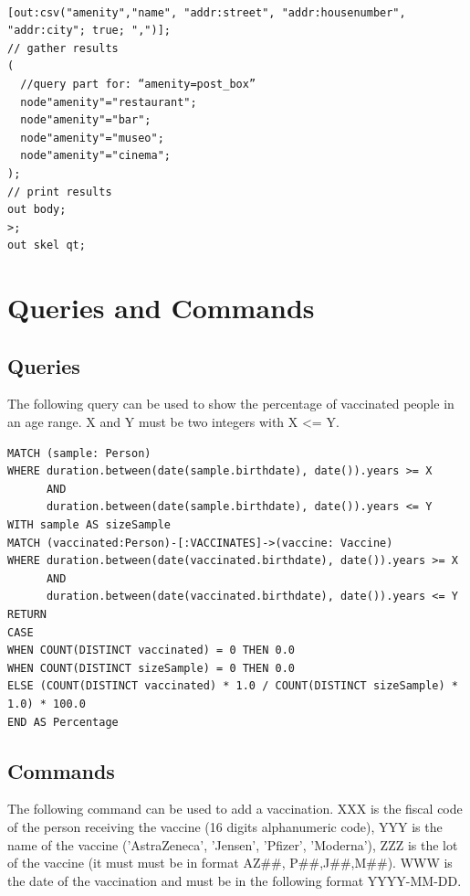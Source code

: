 \documentclass{article}
\begin{document}
\begin{lstlisting}[language=cypher, label=lst:cypher-example]

[out:csv("amenity","name", "addr:street", "addr:housenumber", "addr:city"; true; ",")]; 
// gather results 
( 
  //query part for: “amenity=post_box” 
  node"amenity"="restaurant"; 
  node"amenity"="bar"; 
  node"amenity"="museo"; 
  node"amenity"="cinema"; 
); 
// print results 
out body; 
>; 
out skel qt;
\end{lstlisting}

\section{Queries and Commands}
\subsection{Queries}
The following query can be used to show the percentage of vaccinated people in an age range.
X and Y must be two integers with X <= Y.\\

\begin{lstlisting}[language=cypher, label=lst:cypher-example]
MATCH (sample: Person)
WHERE duration.between(date(sample.birthdate), date()).years >= X 
      AND
      duration.between(date(sample.birthdate), date()).years <= Y
WITH sample AS sizeSample
MATCH (vaccinated:Person)-[:VACCINATES]->(vaccine: Vaccine)
WHERE duration.between(date(vaccinated.birthdate), date()).years >= X 
      AND
      duration.between(date(vaccinated.birthdate), date()).years <= Y
RETURN 
CASE
WHEN COUNT(DISTINCT vaccinated) = 0 THEN 0.0
WHEN COUNT(DISTINCT sizeSample) = 0 THEN 0.0
ELSE (COUNT(DISTINCT vaccinated) * 1.0 / COUNT(DISTINCT sizeSample) * 1.0) * 100.0 
END AS Percentage
\end{lstlisting}

\subsection{Commands}
The following command can be used to add a vaccination. XXX is the fiscal code of the person receiving the vaccine (16 digits alphanumeric code), YYY is the name of the vaccine ('AstraZeneca', 'Jensen', 'Pfizer', 'Moderna'), ZZZ is the lot of the vaccine (it must must be in format AZ##, P##,J##,M##). WWW is the date of the vaccination and must be in the following format YYYY-MM-DD.
\end{document}
